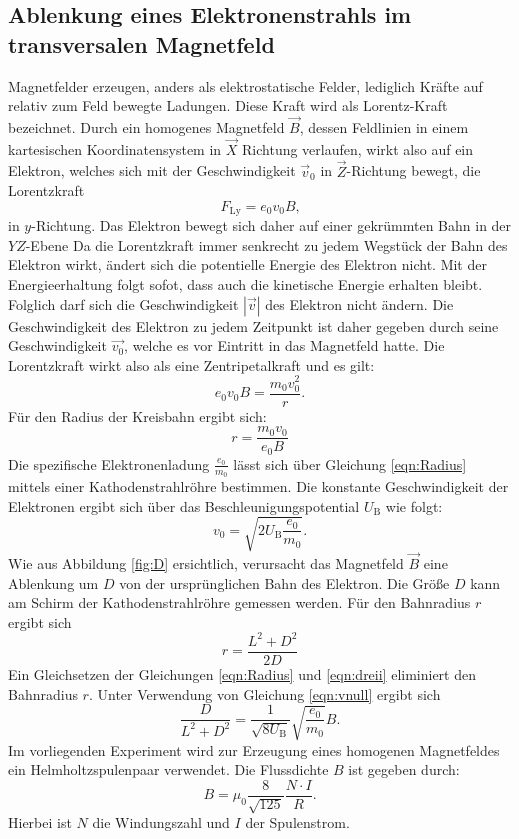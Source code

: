 \subsection{Ablenkung eines Elektronenstrahls im transversalen Magnetfeld}
Magnetfelder erzeugen, anders als elektrostatische Felder, lediglich Kräfte auf relativ zum Feld bewegte Ladungen. Diese Kraft wird als Lorentz-Kraft bezeichnet.
Durch ein homogenes Magnetfeld $\vec{B}$, dessen Feldlinien in einem kartesischen Koordinatensystem in $\vec{X}$ Richtung verlaufen, wirkt also auf ein Elektron, welches sich mit der Geschwindigkeit $\vec{v}_0$ in $\vec{Z}$-Richtung bewegt, die Lorentzkraft
\begin{equation}
  F_\mathrm{Ly}=e_0v_0B \text{,}
\end{equation}
in $y$-Richtung.
Das Elektron bewegt sich daher auf einer gekrümmten Bahn in der $YZ$-Ebene
Da die Lorentzkraft immer senkrecht zu jedem Wegstück der Bahn des Elektron wirkt, ändert sich die potentielle Energie des Elektron nicht.
Mit der Energieerhaltung folgt sofot, dass auch die kinetische Energie erhalten bleibt.
Folglich darf sich die Geschwindigkeit $|\vec{v}|$ des Elektron nicht ändern.
Die Geschwindigkeit des Elektron zu jedem Zeitpunkt ist daher gegeben durch seine Geschwindigkeit $\vec{v_0}$, welche es vor Eintritt in das Magnetfeld hatte.
Die Lorentzkraft wirkt also als eine Zentripetalkraft und es gilt:
\begin{equation}
    e_0v_0B=\frac{m_0v_0^2}{r} \text{.}
\end{equation}
Für den Radius der Kreisbahn ergibt sich:
\begin{equation}
  \label{eqn:Radius}
  r=\frac{m_0v_0}{e_0B}
\end{equation}
Die spezifische Elektronenladung $\frac{e_0}{m_0}$ lässt sich über Gleichung \eqref{eqn:Radius} mittels einer Kathodenstrahlröhre bestimmen.
Die konstante Geschwindigkeit der Elektronen ergibt sich über das Beschleunigungspotential $U_\mathrm{B}$ wie folgt:
\begin{equation}
  \label{eqn:vnull}
  v_0=\sqrt{2U_\mathrm{B}\frac{e_0}{m_0}} \text{.}
\end{equation}
Wie aus Abbildung \ref{fig:D} ersichtlich, verursacht das Magnetfeld $\vec{B}$ eine Ablenkung um $D$ von der ursprünglichen Bahn des Elektron.
Die Größe $D$ kann am Schirm der Kathodenstrahlröhre gemessen werden.
Für den Bahnradius $r$ ergibt sich
\begin{equation}
  \label{eqn:dreii}
  r=\frac{L^2+D^2}{2D}
\end{equation}
Ein Gleichsetzen der Gleichungen \eqref{eqn:Radius} und \eqref{eqn:dreii} eliminiert den Bahnradius $r$. Unter Verwendung von Gleichung \eqref{eqn:vnull} ergibt sich
\begin{equation}
  \frac{D}{L^2+D^2}=\frac{1}{\sqrt{8U_\mathrm{B}}}\sqrt{\frac{e_0}{m_0}}B \text{.}
\end{equation}
Im vorliegenden Experiment wird zur Erzeugung eines homogenen Magnetfeldes ein Helmholtzspulenpaar verwendet.
Die Flussdichte $B$ ist gegeben durch:
\begin{equation}
  B=\mu_0\frac{8}{\sqrt{125}}\frac{N\cdot I}{R} \text{.}
\end{equation}
Hierbei ist $N$ die Windungszahl und $I$ der Spulenstrom.
